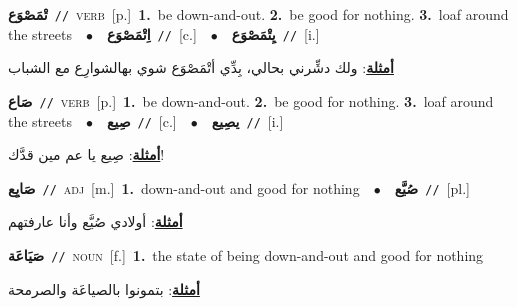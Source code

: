\documentclass[10pt,a4paper,twoside]{article} %
\begin{document}
\begin{multicols}{2}
{\setlength\topsep{0pt}\textbf{\foreignlanguage{arabic}{تْمَصْوَع}}\ {\color{gray}\texttt{//}\color{black}}\ \textsc{verb}\ [p.]\ \textbf{1.}~be down-and-out.  \textbf{2.}~be good for nothing.  \textbf{3.}~loaf around the streets\ \ $\bullet$\ \ \setlength\topsep{0pt}\textbf{\foreignlanguage{arabic}{اِتْمَصْوَع}}\ {\color{gray}\texttt{//}\color{black}}\ [c.]\ \ $\bullet$\ \ \setlength\topsep{0pt}\textbf{\foreignlanguage{arabic}{يِتْمَصْوَع}}\ {\color{gray}\texttt{//}\color{black}}\ [i.]\  \begin{flushright}\color{gray}\foreignlanguage{arabic}{\textbf{\underline{\foreignlanguage{arabic}{أمثلة}}}: ولك دشِّرني بحالي، بِدِّي أتْمَصْوَع شوي بهالشوارِع مع الشباب}\end{flushright}\color{black}} \vspace{2mm}

{\setlength\topsep{0pt}\textbf{\foreignlanguage{arabic}{صَاع}}\ {\color{gray}\texttt{//}\color{black}}\ \textsc{verb}\ [p.]\ \textbf{1.}~be down-and-out.  \textbf{2.}~be good for nothing.  \textbf{3.}~loaf around the streets\ \ $\bullet$\ \ \setlength\topsep{0pt}\textbf{\foreignlanguage{arabic}{صِيع}}\ {\color{gray}\texttt{//}\color{black}}\ [c.]\ \ $\bullet$\ \ \setlength\topsep{0pt}\textbf{\foreignlanguage{arabic}{يصِيع}}\ {\color{gray}\texttt{//}\color{black}}\ [i.]\  \begin{flushright}\color{gray}\foreignlanguage{arabic}{\textbf{\underline{\foreignlanguage{arabic}{أمثلة}}}: صِيع يا عم مين قدَّك!}\end{flushright}\color{black}} \vspace{2mm}

{\setlength\topsep{0pt}\textbf{\foreignlanguage{arabic}{صَايِع}}\ {\color{gray}\texttt{//}\color{black}}\ \textsc{adj}\ [m.]\ \textbf{1.}~down-and-out and good for nothing\ \ $\bullet$\ \ \setlength\topsep{0pt}\textbf{\foreignlanguage{arabic}{صُيَّع}}\ {\color{gray}\texttt{//}\color{black}}\ [pl.]\  \begin{flushright}\color{gray}\foreignlanguage{arabic}{\textbf{\underline{\foreignlanguage{arabic}{أمثلة}}}: أولادي صُيَّع وأنا عارفتهم}\end{flushright}\color{black}} \vspace{2mm}

{\setlength\topsep{0pt}\textbf{\foreignlanguage{arabic}{صَيَاعَة}}\ {\color{gray}\texttt{//}\color{black}}\ \textsc{noun}\ [f.]\ \textbf{1.}~the state of being down-and-out and good for nothing\  \begin{flushright}\color{gray}\foreignlanguage{arabic}{\textbf{\underline{\foreignlanguage{arabic}{أمثلة}}}: بتمونوا بالصياعَة والصرمحة}\end{flushright}\color{black}} \vspace{2mm}


\end{multicols}
\end{document}
